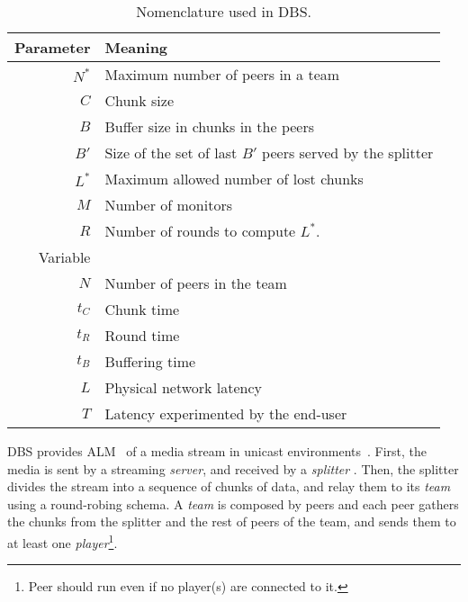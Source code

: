 

\label{sec:DBS}

\begin{table}
  \centering
  \begin{tabular}{rl}
    Parameter & Meaning \\
    \hline
    $N^*$  & Maximum number of peers in a team \\
    $C$    & Chunk size \\
    $B$    & Buffer size in chunks in the peers \\
    $B'$   & Size of the set of last $B'$ peers served by the splitter \\ 
    $L^*$  & Maximum allowed number of lost chunks \\
    $M$    & Number of monitors \\
    $R$    & Number of rounds to compute $L^*$. \\
    Variable & \\
    \hline
    $N$    & Number of peers in the team \\
    $t_C$  & Chunk time \\
    $t_R$  & Round time \\
    $t_B$  & Buffering time \\
    $L$    & Physical network latency \\
    $T$    & Latency experimented by the end-user
  \end{tabular}
  \caption{Nomenclature used in DBS.} %
  \label{tab:DBS_nomenclature}
\end{table}

DBS provides ALM~\cite{banerjee2002scalable} of a media stream in
unicast environments~\cite{comer2003computer}. First, the media is
sent by a streaming \emph{server}, and received by a \emph{splitter}
. Then, the splitter divides the stream
into a sequence of chunks of data, and relay them to its \emph{team}
using a round-robing schema. A \emph{team} is composed by peers and
each peer gathers the chunks from the splitter and the rest of peers
of the team, and sends them to at least one
\emph{player}\footnote{Peer should run even if no player(s) are
  connected to it.}.

\begin{comment}
In single layered streams\footnote{Each layer of a
  scalable stream is received by a different peer attached to the same
  player capable or render scalable media.}, each peer is spawned by a
player (normal users should not run peers directly).
\end{comment}

\begin{comment}
/* quitar: We define the set of teams as
$\{T\}$,
and enumerate the peers in the team $T$ as $T=\{P_1,\cdots,P_{|T|}\}$. */
\end{comment}
